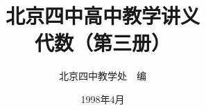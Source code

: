 \documentclass[b5paper, openany]{ctexbook}
\theoremstyle{plain}
\begin{document}
\title{\Huge\bfseries 北京四中高中教学讲义\\代数（第三册）}



\author{\Large 北京四中教学处~~编}
\date{\Large 1998年4月}

\maketitle




\frontmatter


\tableofcontents


\mainmatter

\setcounter{chapter}{7}











\backmatter

% 
\end{document}
